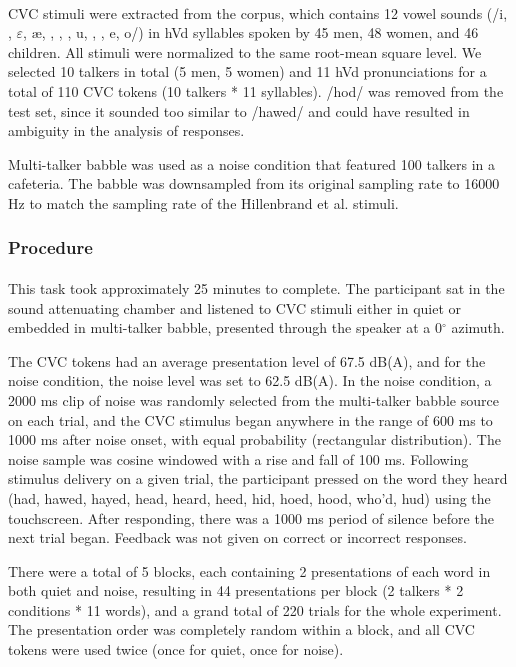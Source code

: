 \paragraph{}CVC stimuli were extracted from the  corpus, which contains 12 vowel sounds (/i, \textsci , $\varepsilon$, \ae , \textscripta , \textopeno , \textscu , u, \textturnv , \textrhookrevepsilon , e, o/) in hVd syllables spoken by 45 men, 48 women, and 46 children.  All stimuli were normalized to the same root-mean square level.  We selected 10 talkers in total (5 men, 5 women) and 11 hVd pronunciations for a total of 110 CVC tokens (10 talkers * 11 syllables).  /hod/ was removed from the test set, since it sounded too similar to /hawed/ and could have resulted in ambiguity in the analysis of responses.

Multi-talker babble was used as a noise condition that featured 100 talkers in a cafeteria.  The babble was downsampled from its original sampling rate to 16000 Hz to match the sampling rate of the Hillenbrand et al. stimuli.
\subsubsection{Procedure}
\paragraph{}This task took approximately 25 minutes to complete.  The participant sat in the sound attenuating chamber and listened to CVC stimuli either in quiet or embedded in multi-talker babble, presented through the speaker at a 0$^\circ$ azimuth.

The CVC tokens had an average presentation level of 67.5 dB(A), and for the noise condition, the noise level was set to 62.5 dB(A).  In the noise condition, a 2000 ms clip of noise was randomly selected from the multi-talker babble source on each trial, and the CVC stimulus began anywhere in the range of 600 ms to 1000 ms after noise onset, with equal probability (rectangular distribution).  The noise sample was cosine windowed with a rise and fall of 100 ms.  Following stimulus delivery on a given trial, the participant pressed on the word they heard (had, hawed, hayed, head, heard, heed, hid, hoed, hood, who'd, hud) using the touchscreen.  After responding, there was a 1000 ms period of silence before the next trial began.  Feedback was not given on correct or incorrect responses.

There were a total of 5 blocks, each containing 2 presentations of each word in both quiet and noise, resulting in 44 presentations per block (2 talkers * 2 conditions * 11 words), and a grand total of 220 trials for the whole experiment.  The presentation order was completely random within a block, and all CVC tokens were used twice (once for quiet, once for noise).

